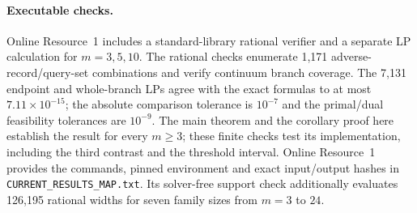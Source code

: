 \paragraph{Executable checks.}
Online Resource~1 includes a standard-library rational verifier and a
separate LP calculation for $m=3,5,10$. The rational checks enumerate
1,171 adverse-record/query-set combinations and verify continuum branch
coverage. The 7,131 endpoint and whole-branch LPs agree with the exact
formulas to at most $7.11\times10^{-15}$; the absolute comparison tolerance
is $10^{-7}$ and the primal/dual feasibility tolerances are $10^{-9}$.
The main theorem and the corollary proof here establish the result for
every $m\geq3$; these finite
checks test its implementation, including the third contrast and the
threshold interval. Online Resource~1 provides the commands, pinned environment and exact
input/output hashes in \texttt{CURRENT\_RESULTS\_MAP.txt}. Its solver-free
support check additionally evaluates 126,195 rational widths for seven
family sizes from $m=3$ to $24$.
